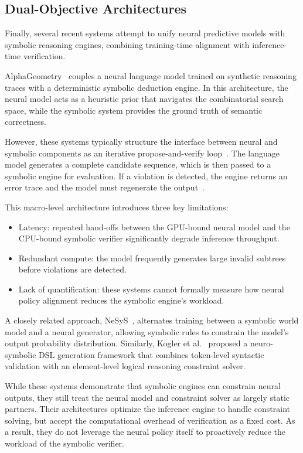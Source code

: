   \subsection{Dual-Objective Architectures}
  Finally, several recent systems attempt to unify neural predictive models with symbolic
  reasoning engines, combining training-time alignment with inference-time
  verification.

  AlphaGeometry~\cite{trinh2024solving} couples a neural language model trained on synthetic
  reasoning traces with a deterministic symbolic deduction engine. In this
  architecture, the neural model acts as a heuristic prior that navigates the
  combinatorial search space, while the symbolic system provides the ground truth
  of semantic correctness.

  However, these systems typically structure the interface between neural and
  symbolic components as an iterative propose-and-verify loop~\cite{jiang2022draft}. The language model
  generates a complete candidate sequence, which is then passed to a symbolic
  engine for evaluation. If a violation is detected, the engine returns an error
  trace and the model must regenerate the output~\cite{jiang2022draft}.

  This macro-level architecture introduces three key limitations:
  \begin{itemize}
  \item Latency: repeated hand-offs between the GPU-bound neural model and the
  CPU-bound symbolic verifier significantly degrade inference throughput.
  \item Redundant compute: the model frequently generates large invalid subtrees
  before violations are detected.
  \item Lack of quantification: these systems cannot formally measure how neural
  policy alignment reduces the symbolic engine's workload.
  \end{itemize}

  A closely related approach, NeSyS~\cite{zhao2026neuro}, alternates training between a
  symbolic world model and a neural generator, allowing symbolic rules to
  constrain the model's output probability distribution. Similarly, Kogler
  et al.~\cite{kogler2026towards} proposed a neuro-symbolic DSL generation framework that combines
  token-level syntactic validation with an element-level logical reasoning
  constraint solver.

  While these systems demonstrate that symbolic engines can constrain neural
  outputs, they still treat the neural model and constraint solver as largely
  static partners. Their architectures optimize the inference engine to handle
  constraint solving, but accept the computational overhead of verification as a
  fixed cost. As a result, they do not leverage the neural policy itself to
  proactively reduce the workload of the symbolic verifier.